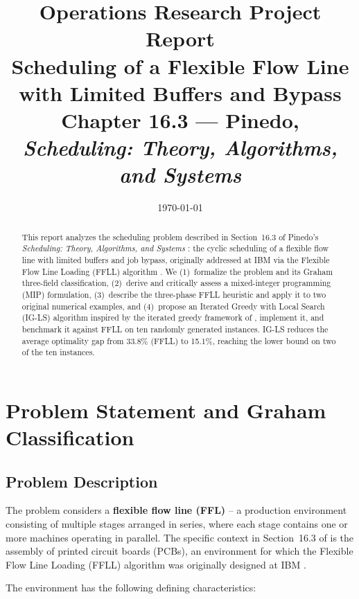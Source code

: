 \documentclass[11pt,a4paper]{article}
\title{\vspace{-1.5cm}
  {\color{steel}\Large Operations Research Project Report}\\[0.4cm]
  {\color{navy}\Huge\bfseries Scheduling of a Flexible Flow Line\\ with Limited Buffers and Bypass}\\[0.3cm]
  {\large Chapter 16.3 --- Pinedo, \textit{Scheduling: Theory, Algorithms, and Systems}}
}
\author{}
\date{\today}
\begin{document}
\maketitle
\thispagestyle{empty}

\begin{abstract}
\noindent
This report analyzes the scheduling problem described in Section~16.3 of
Pinedo's \textit{Scheduling: Theory, Algorithms, and Systems}
\citep{pinedo2016scheduling}: the cyclic scheduling of a flexible flow
line with limited buffers and job bypass, originally addressed at IBM via
the Flexible Flow Line Loading (FFLL) algorithm \citep{ibm_ffll}. We
(1)~formalize the problem and its Graham three-field classification,
(2)~derive and critically assess a mixed-integer programming (MIP)
formulation, (3)~describe the three-phase FFLL heuristic and apply it to
two original numerical examples, and (4)~propose an Iterated Greedy with
Local Search (IG-LS) algorithm inspired by the iterated greedy framework of
\citet{ruiz2007simple}, implement it, and benchmark it against FFLL on
ten randomly generated instances. IG-LS reduces the average optimality gap
from 33.8\% (FFLL) to 15.1\%, reaching the lower bound on two of the ten
instances.
\end{abstract}

\vspace{0.5cm}
\tableofcontents
\newpage

\section{Problem Statement and Graham Classification}

\subsection{Problem Description}

The problem considers a \textbf{flexible flow line (FFL)} -- a production
environment consisting of multiple stages arranged in series, where each
stage contains one or more machines operating in parallel. The specific
context in Section~16.3 of \citet{pinedo2016scheduling} is the assembly
of printed circuit boards (PCBs), an environment for which the Flexible
Flow Line Loading (FFLL) algorithm was originally designed at IBM
\citep{ibm_ffll}.

The environment has the following defining characteristics:
\end{document}
